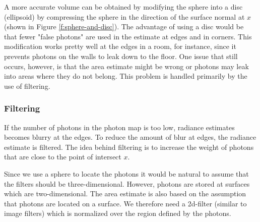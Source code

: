 A more accurate volume can be obtained by modifying the sphere into a disc (ellipsoid) by compressing the sphere in the direction of the surface normal at $x$ (shown in Figure \ref{f:sphere-and-disc}). The advantage of using a disc would be that fewer "false photons" are used in the estimate at edges and in corners. This modification works pretty well at the edges in a room, for instance, since it prevents photons on the walls to leak down to the floor. One issue that still occurs, however, is that the area estimate might be wrong or photons may leak into areas where they do not belong. This problem is handled primarily by the use of filtering.




\subsubsection{Filtering}
If the number of photons in the photon map is too low, radiance estimates becomes blurry at the edges. To reduce the amount of blur at edges, the radiance estimate is filtered. The idea behind filtering is to increase the weight of photons that are close to the point of intersect $x$. 

Since we use a sphere to locate the photons it would be natural to assume that the filters should be three-dimensional. However, photons are stored at surfaces which are two-dimensional. The area estimate is also based on the assumption that photons are located on a surface. We therefore need a 2d-filter (similar to image filters) which is normalized over the region defined by the photons.

